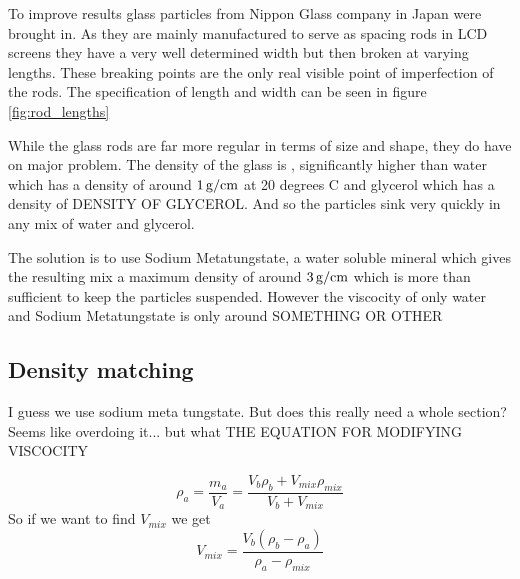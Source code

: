 	To improve results glass particles from Nippon Glass company in Japan were brought in. As they are mainly manufactured to serve as spacing rods in LCD screens they have a very well determined width but then broken at varying lengths. These breaking points are the only real visible point of imperfection of the rods.
	The specification of length and width can be seen in figure \ref{fig:rod_lengths}
	
	While the glass rods are far more regular in terms of size and shape, they do have on major problem. The density of the glass is , significantly higher than water which has a density of around $\unit[1]{g/cm}$ at 20 degrees C and glycerol which has a density of DENSITY OF GLYCEROL. And so the particles sink very quickly in any mix of water and glycerol.
	
	The solution is to use Sodium Metatungstate, a water soluble mineral which gives the resulting mix a maximum density of around $\unit[3]{g/cm}$ which is more than sufficient to keep the particles suspended. However the viscocity of only water and Sodium Metatungstate is only around  SOMETHING OR OTHER

	
	
	
\subsection{Density matching}

I guess we use sodium meta tungstate. But does this really need a whole section? Seems like overdoing it... but what %
THE EQUATION FOR MODIFYING VISCOCITY

\begin{equation}
\rho_{a} = 	\frac {m_{a}}{V_{a}} =
				\frac{V_{b}\rho_{b} + V_{mix}\rho_{mix}}{V_b + V_{mix}} 
\end{equation}
So if we want to find $V_{mix}$ we get
\begin{equation}
V_{mix} = \frac{ V_{b}(\rho_{b} - \rho_{a})}{\rho_{a} - \rho_{mix}} 
\end{equation}

